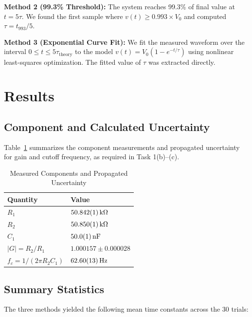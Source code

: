 \documentclass[11pt]{article}
\begin{document}
\textbf{Method 2 (99.3\% Threshold):} The system reaches 99.3\% of final value at $t = 5\tau$. We found the first sample where $v(t) \geq 0.993 \times V_0$ and computed $\tau = t_{993} / 5$.

\textbf{Method 3 (Exponential Curve Fit):} We fit the measured waveform over the interval $0 \leq t \leq 5\tau_{\text{theory}}$ to the model $v(t) = V_0 \left( 1 - e^{-t/\tau} \right)$ using nonlinear least-squares optimization. The fitted value of $\tau$ was extracted directly.

\section{Results}

\subsection{Component and Calculated Uncertainty}
Table~\ref{tab:uncertainty_summary} summarizes the component measurements and propagated uncertainty for gain and cutoff frequency, as required in Task 1(b)--(c).

\begin{table}[H]
  \centering
  \caption{Measured Components and Propagated Uncertainty}
  \label{tab:uncertainty_summary}
  \begin{tabular}{ll}
    \toprule
    \textbf{Quantity} & \textbf{Value} \\
    \midrule
    $R_1$ & $\SI{50.842 \pm 0.001}{\kilo\ohm}$ \\
    $R_2$ & $\SI{50.850 \pm 0.001}{\kilo\ohm}$ \\
    $C_1$ & $\SI{50.0 \pm 0.1}{\nano\farad}$ \\
    $|G| = R_2/R_1$ & $1.000157 \pm 0.000028$ \\
    $f_c = 1/(2\pi R_2 C_1)$ & $\SI{62.60 \pm 0.13}{\hertz}$ \\
    \bottomrule
  \end{tabular}
\end{table}

\subsection{Summary Statistics}
The three methods yielded the following mean time constants across the 30 trials:
\end{document}
